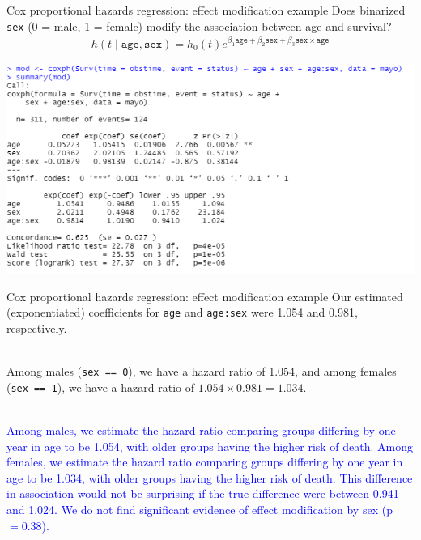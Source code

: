 \documentclass[10pt,t]{beamer}
\begin{document}
\begin{frame}{Cox proportional hazards regression: effect modification example}
	Does binarized \texttt{sex} (0 = male, 1 = female) modify the association between age and survival?
	\begin{align*}
		h(t \mid \texttt{age}, \texttt{sex}) = h_0(t)e^{\beta_1\texttt{age} + \beta_2\texttt{sex} + \beta_3\texttt{sex}\times\texttt{age}}
	\end{align*}
			\begin{center}
		\includegraphics[width = \textwidth]{figs/interaction.png}
	\end{center} 
\end{frame}

\begin{frame}{Cox proportional hazards regression: effect modification example}
	Our estimated (exponentiated) coefficients for \texttt{age} and \texttt{age:sex} were 1.054 and 0.981, respectively.
	\\ ~\ 
	
	Among males (\texttt{sex == 0}), we have a hazard ratio of 1.054, and among females (\texttt{sex == 1}), we have a hazard ratio of $1.054 \times 0.981 = 1.034$.  
	\\ ~\ 
	
	\textcolor{blue}{Among males, we estimate the hazard ratio comparing groups differing by one year in age to be 1.054, with older groups having the higher risk of death. Among females, we estimate the hazard ratio comparing groups differing by one year in age to be 1.034, with older groups having the higher risk of death. This difference in association would not be surprising if the true difference were between 0.941 and 1.024. We do not find significant evidence of effect modification by sex (p $= 0.38$).}
\end{frame}
\end{document}
